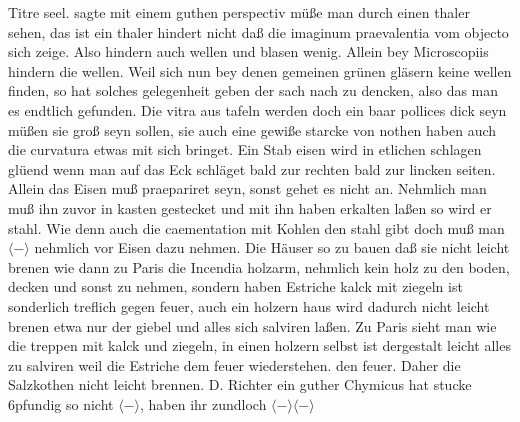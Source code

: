 Titre\protect{} seel. sagte mit einem guthen perspectiv m\"{u}ße man durch einen thaler sehen, das ist ein thaler hindert nicht daß die imaginum praevalentia vom objecto sich zeige. Also hindern auch wellen und blasen wenig. Allein bey Microscopiis\protect{} hindern  die wellen. Weil sich nun bey denen  gemeinen gr\"{u}nen gl\"{a}sern keine wellen  finden, so hat solches gelegenheit geben der  sach nach zu dencken, also das man es endtlich gefunden.  Die vitra aus tafeln werden doch ein baar pollices dick seyn m\"{u}ßen sie groß seyn sollen, sie auch eine gewiße  starcke von nothen haben auch die curvatura etwas  mit sich bringet. \pend \pstart  Ein Stab eisen wird in etlichen schlagen gl\"{u}end  wenn man auf das Eck schl\"{a}get bald zur rechten  bald zur lincken seiten. Allein das Eisen  muß praepariret seyn, sonst gehet es nicht an.  Nehmlich man muß ihn zuvor in kasten gestecket und mit ihn haben erkalten laßen  so wird er  stahl. Wie denn  auch die caementation mit Kohlen den stahl gibt  doch muß man $\langle - \rangle $ nehmlich vor Eisen dazu nehmen. Die H\"{a}user so zu bauen daß sie nicht leicht brenen  wie dann zu Paris\protect{} die Incendia holzarm, nehmlich  kein holz zu den boden, decken und sonst  zu nehmen, sondern haben Estriche kalck mit ziegeln ist sonderlich treflich gegen feuer, auch ein holzern haus wird dadurch nicht leicht brenen  etwa nur der giebel und alles sich salviren laßen. Zu Paris\protect{} sieht man wie die treppen mit kalck und ziegeln,  in einen holzern selbst ist dergestalt leicht alles zu salviren weil die Estriche dem  feuer wiederstehen.   den feuer. Daher die Salzkothen nicht leicht brennen. D. Richter\protect{} ein guther Chymicus hat stucke  6pfundig so nicht $\langle - \rangle $, haben ihr zundloch $\langle - \rangle \langle - \rangle $\pend 